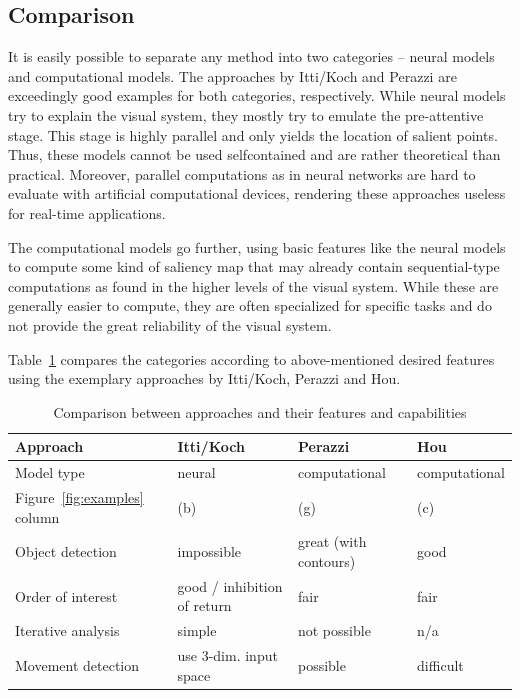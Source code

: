 \documentclass[a4paper,12pt,fleqn,oneside]{scrartcl}
\begin{document}
\subsection{Comparison}

It is easily possible to separate any method into two categories -- neural models and computational models. The
approaches by Itti/Koch and Perazzi are exceedingly good examples for both categories, respectively. While neural models
try to  explain the visual system, they mostly try to emulate the pre-attentive stage. This stage is highly
parallel\cite{itti2001} and only yields the location of salient points. Thus, these models cannot be used selfcontained
and are rather theoretical than practical. Moreover, parallel computations as in neural networks are hard to evaluate
with artificial computational devices, rendering these approaches useless for real-time applications.

The computational models go further, using basic features like the neural models to compute some kind of saliency map
that may already contain sequential-type computations as found in the higher levels of the visual system. While these
are generally  easier to compute, they are often specialized for specific tasks and do not provide the great reliability
of the visual system.

Table~\ref{tbl:comparison} compares the categories according to above-mentioned desired features using the exemplary
approaches by Itti/Koch, Perazzi and Hou.

\begin{table}[hbt]
    \scriptsize
    {
    \def\arraystretch{1.5}
    \begin{tabularx}{\textwidth}{lXXX}
    \hline
    \textbf{Approach}
        & \textbf{Itti/Koch} 
        & \textbf{Perazzi}
        & \textbf{Hou} \\ 
    \hline
    Model type
        & neural
        & computational
        & computational \\
    Figure~\ref{fig:examples} column
        & (b)
        & (g)
        & (c) \\
    \hline
    Object detection     
        & impossible              
        & great (with contours)
        & good \\
    Order of interest     
        & good / inhibition of return              
        & fair
        & fair \\
    Iterative analysis  
        & simple
        & not possible
        & n/a \\
    Movement detection      
        & use 3-dim. input space
        & possible
        & difficult \\
    \hline
    \end{tabularx}
    }

    \caption{Comparison between approaches and their features and capabilities}
    \label{tbl:comparison}
\end{table}
\end{document}
